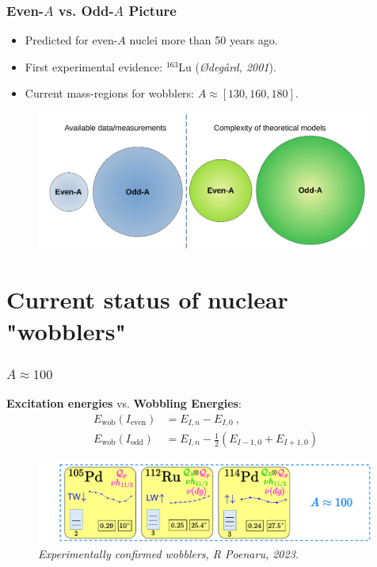 \documentclass{beamer}
\begin{document}
\begin{frame}
	\frametitle{Even-$A$ vs. Odd-$A$ Picture}
	\begin{itemize}
		\item Predicted for even-$A$ nuclei more than 50 years ago.
		\item First experimental evidence: $^{163}$Lu (\textit{Ødegård, 2001}). %
		\item Current mass-regions for wobblers: $A\approx[130,160,180]$.
	\end{itemize}
	\begin{figure}
		\centering
		\includegraphics[width=0.99\textwidth]{figures/even-vs-odda.pdf}
	\end{figure}
\end{frame}

\section{Current status of nuclear "wobblers"}

\begin{frame}
    \frametitle{$A\approx100$}
    \textbf{Excitation energies} vs. \textbf{Wobbling Energies}:
	\begin{align}
		E_\text{wob}(I_\text{even})&=E_{I,n}-E_{I,0}\ ,\nonumber \\
		E_\text{wob}(I_\text{odd})&=E_{I,n}-\frac{1}{2}\left(E_{I-1,0}+E_{I+1,0}\right) \nonumber
	\end{align}
    \begin{figure}
        \centering
        \includegraphics[width=0.99\textwidth]{figures/wobblers-chart-1.pdf}
        \caption{\textit{Experimentally confirmed wobblers, R Poenaru, 2023.}}
    \end{figure}
\end{frame}
\end{document}
